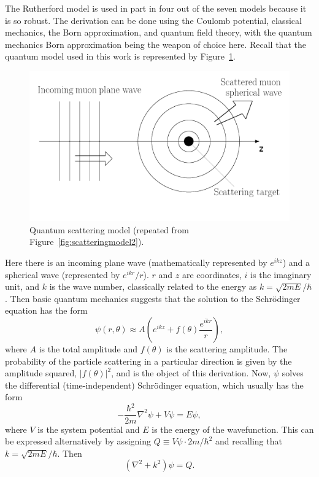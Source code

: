 The Rutherford model is used in part in four out of the seven models because it is so robust. The derivation can be done using the Coulomb potential, classical mechanics, the Born approximation, and quantum field theory, with the quantum mechanics Born approximation being the weapon of choice here. Recall that the quantum model used in this work is represented by Figure~\ref{fig:qmscatteringmodel}.
\begin{figure}
  \centering
    \includegraphics[width=\textwidth]{Figures/scattering_model_2} 
  \caption{Quantum scattering model (repeated from Figure~\ref{fig:scatteringmodel2}).}
  \label{fig:qmscatteringmodel}
\end{figure}
Here there is an incoming plane wave (mathematically represented by $e^{ikz}$) and a spherical wave (represented by $e^{ikr}/r$). $r$ and $z$ are coordinates, $i$ is the imaginary unit, and $k$ is the wave number, classically related to the energy as $k=\sqrt{2mE}/\hbar$. Then basic quantum mechanics suggests that the solution to the Schr\"{o}dinger equation has the form
\begin{equation}
\label{eqn:scatteringwavefunction}
\psi (r,\theta)\approx A \left(e^{ikz}+f(\theta)\frac{e^{ikr}}{r}\right),
\end{equation}
where $A$ is the total amplitude and $f(\theta)$ is the scattering amplitude. The probability of the particle scattering in a particular direction is given by the amplitude squared, $|f(\theta)|^2$, and is the object of this derivation. Now, $\psi$ solves the differential (time-independent) Schr\"{o}dinger equation, which usually has the form
\begin{equation} \nonumber
-\frac{\hbar^2}{2m}\nabla^2\psi+V\psi=E\psi,
\end{equation}
where $V$ is the system potential and $E$ is the energy of the wavefunction. This can be expressed alternatively by assigning $Q\equiv V\psi\cdot{2m}/{\hbar^2}$ and recalling that $k=\sqrt{2mE}/\hbar$. Then
%
\begin{equation}
\label{eqn:schrodinger}
(\nabla^2+k^2)\psi=Q.
\end{equation}


